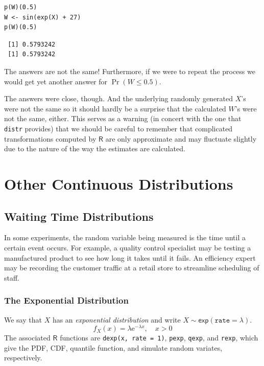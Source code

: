 \documentclass[captions=tableheading]{scrbook}
\begin{document}
\begin{verbatim}
p(W)(0.5)
W <- sin(exp(X) + 27)
p(W)(0.5)
\end{verbatim}

\begin{verbatim}
 [1] 0.5793242
 [1] 0.5793242
\end{verbatim}

The answers are not the same! Furthermore, if we were to repeat the process we would get yet another answer for \(\Pr(W\leq0.5)\).  

The answers were close, though. And the underlying randomly generated \(X\)'s were not the same so it should hardly be a surprise that the calculated \(W\)'s were not the same, either. This serves as a warning (in concert with the one that \texttt{distr} provides) that we should be careful to remember that complicated transformations computed by \(\mathsf{R}\) are only approximate and may fluctuate slightly due to the nature of the way the estimates are calculated.
\section{Other Continuous Distributions}
\label{sec-6-5}
\label{sec-Other-Continuous-Distributions}
\subsection{Waiting Time Distributions}
\label{sec-6-5-1}
\label{sub-Waiting-Time-Distributions}


In some experiments, the random variable being measured is the time until a certain event occurs. For example, a quality control specialist may be testing a manufactured product to see how long it takes until it fails. An efficiency expert may be recording the customer traffic at a retail store to streamline scheduling of staff. 
\subsubsection{The Exponential Distribution}
\label{sec-6-5-1-1}
\label{sub-The-Exponential-Distribution}


We say that \(X\) has an \emph{exponential distribution} and write \(X\sim\mathsf{exp}(\mathtt{rate}=\lambda)\). 
\begin{equation}
f_{X}(x)=\lambda\mathrm{e}^{-\lambda x},\quad x>0
\end{equation}
The associated \(\mathsf{R}\) functions are \texttt{dexp(x, rate = 1)}, \texttt{pexp}, \texttt{qexp}, and \texttt{rexp}, which give the PDF, CDF, quantile function, and simulate random variates, respectively.
\end{document}
